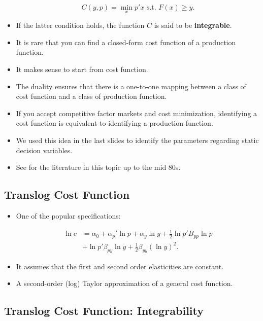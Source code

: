 \documentclass[]{book}
\providecommand{\tightlist}{%
  \setlength{\itemsep}{0pt}\setlength{\parskip}{0pt}}
\theoremstyle{definition}
\theoremstyle{definition}
\theoremstyle{definition}
\theoremstyle{remark}
\begin{document}
\begin{itemize}
  \begin{equation}
  C(y, p) = \min_{x} p'x \text{   s.t.   } F(x) \ge y.
  \end{equation}
\item
  If the latter condition holds, the function \(C\) is said to be
  \textbf{integrable}.
\item
  It is rare that you can find a closed-form cost function of a
  production function.
\item
  It makes sense to start from cost function.
\item
  The duality ensures that there is a one-to-one mapping between a class
  of cost function and a class of production function.
\item
  If you accept competitive factor markets and cost minimization,
  identifying a cost function is equivalent to identifying a production
  function.
\item
  We used this idea in the last slides to identify the parameters
  regarding static decision variables.
\item
  See \citet{Jorgenson1986} for the literature in this topic up to the
  mid 80s.
\end{itemize}

\subsection{Translog Cost Function}\label{translog-cost-function}

\begin{itemize}
\tightlist
\item
  One of the popular specifications:

  \begin{equation}
  \begin{split}
  \ln c &= \alpha_0 + \alpha_p' \ln p + \alpha_y \ln y + \frac{1}{2} \ln p' B_{pp} \ln p\\
  & + \ln p' \beta_{py} \ln y + \frac{1}{2}\beta_{yy}(\ln y)^2.
  \end{split}
  \end{equation}
\item
  It assumes that the first and second order elasticities are constant.
\item
  A second-order (log) Taylor approximation of a general cost function.
\end{itemize}

\subsection{Translog Cost Function:
Integrability}\label{translog-cost-function-integrability}
\end{document}
